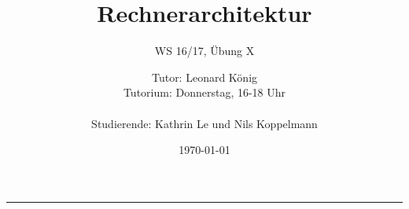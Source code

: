 \documentclass[
	11pt,								%
	parskip=half-,						%
	paper=a4,							%
	english,ngerman,					%
	]{scrartcl}							%
\begin{document}
\begin{titlepage}
	\subject{Jochen Schiller}					%
	\title{Rechnerarchitektur}	%
	\subtitle{\Large WS 16/17, Übung X}	%
	\author{%
    	Tutor: Leonard König\\			%
        Tutorium: Donnerstag, 16-18 Uhr\\ \\	%
        Studierende: Kathrin Le und Nils Koppelmann}		%
	\date{\normalsize \today}					%
\end{titlepage}

\maketitle								%
\vspace*{-11cm}							%

\vspace{8.2cm}							%
\rule{\linewidth}{0.8pt}				%

\section*{}

\end{document}
